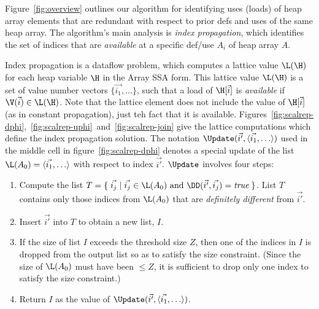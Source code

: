 Figure~\ref{fig:overview} outlines our algorithm for identifying
uses (loads) of 
heap array elements that are redundant with respect to prior 
defs and uses of the same heap array.
The algorithm's main analysis is {\it index propagation},
which identifies the set of indices that
are {\em available} at a specific def/use  $A_i$ of heap array $A$.

Index propagation is a dataflow problem, which computes a lattice value
$\L(\H)$ for each heap variable $\H$ in the Array SSA form.  This
lattice value $\L(\H)$ is a set of value number vectors $\{\vec{i_1},\ldots \}$, such that a load of $\H[\vec{i}]$ is {\em available}
if $\V(\vec{i}) \in \L(\H)$.  Note that the lattice element does not include the value of $\H[\vec{i}]$ (as in constant propagation), just teh fact that it is available.
Figures~\ref{fig:scalrep-dphi},~\ref{fig:scalrep-uphi}~and~\ref{fig:scalrep-join} give the lattice computations which define the index propagation solution.
The notation 
$\Update(\vec{i'},\langle \vec{i_1}, \ldots \rangle)$
used in the middle cell in 
figure~\ref{fig:scalrep-dphi} denotes a special update of 
the list $\L(A_0) = \langle \vec{i_1}, \ldots \rangle$
with respect to index $\vec{i'}$.
$\Update$ involves four steps:
\begin{enumerate}
\item Compute the list $T = \{\;\vec{i_j}\;|\;\vec{i_j}\in\L(A_0)
\mbox{~and~}\DD(\vec{i'},\vec{i_j})=\mbox{\it true}\;\}$.  List $T$
contains only those indices from $\L(A_0)$ that are
{\it definitely different} from $\vec{i'}$.

\item Insert $\vec{i'}$ into $T$ to obtain a new list, $I$.
\item If the 
size of list
$I$ exceeds the threshold size $Z$, then one of the indices in $I$ is
dropped from the output list so as to satisfy the size constraint.  
(Since the size of $\L(A_0)$ must have been $\leq Z$, it is sufficient
to drop only one index to satisfy the size constraint.)
\item Return $I$ as the value of 
$\Update(\vec{i'},\langle \vec{i_1}, \ldots \rangle)$.
\end{enumerate}


